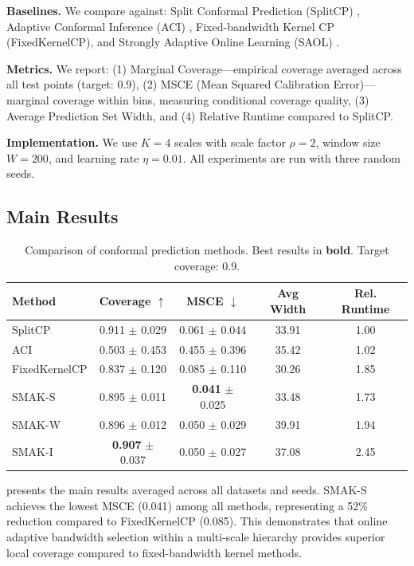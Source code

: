 \documentclass{article}
\theoremstyle{definition}
\begin{document}
\textbf{Baselines.} We compare against: Split Conformal Prediction (SplitCP) \citep{papadopoulos2002inductive}, Adaptive Conformal Inference (ACI) \citep{gibbs2021adaptive}, Fixed-bandwidth Kernel CP (FixedKernelCP), and Strongly Adaptive Online Learning (SAOL) \citep{bhatnagar2023improved}.

\textbf{Metrics.} We report: (1) Marginal Coverage---empirical coverage averaged across all test points (target: 0.9), (2) MSCE (Mean Squared Calibration Error)---marginal coverage within bins, measuring conditional coverage quality, (3) Average Prediction Set Width, and (4) Relative Runtime compared to SplitCP.

\textbf{Implementation.} We use $K=4$ scales with scale factor $\rho = 2$, window size $W = 200$, and learning rate $\eta = 0.01$. All experiments are run with three random seeds.

\subsection{Main Results}

\begin{table}[t]
\caption{Comparison of conformal prediction methods. Best results in \textbf{bold}. Target coverage: 0.9.}
\label{tab:main}
\centering
\begin{tabular}{lcccc}
\toprule
Method & Coverage $\uparrow$ & MSCE $\downarrow$ & Avg Width & Rel. Runtime \\
\midrule
SplitCP & 0.911 $\pm$ 0.029 & 0.061 $\pm$ 0.044 & 33.91 & 1.00 \\
ACI & 0.503 $\pm$ 0.453 & 0.455 $\pm$ 0.396 & 35.42 & 1.02 \\
FixedKernelCP & 0.837 $\pm$ 0.120 & 0.085 $\pm$ 0.110 & 30.26 & 1.85 \\
\midrule
SMAK-S & 0.895 $\pm$ 0.011 & \textbf{0.041} $\pm$ 0.025 & 33.48 & 1.73 \\
SMAK-W & 0.896 $\pm$ 0.012 & 0.050 $\pm$ 0.029 & 39.91 & 1.94 \\
SMAK-I & \textbf{0.907} $\pm$ 0.037 & 0.050 $\pm$ 0.027 & 37.08 & 2.45 \\
\bottomrule
\end{tabular}
\end{table}

 presents the main results averaged across all datasets and seeds. SMAK-S achieves the lowest MSCE (0.041) among all methods, representing a 52\% reduction compared to FixedKernelCP (0.085). This demonstrates that online adaptive bandwidth selection within a multi-scale hierarchy provides superior local coverage compared to fixed-bandwidth kernel methods.
\end{document}
